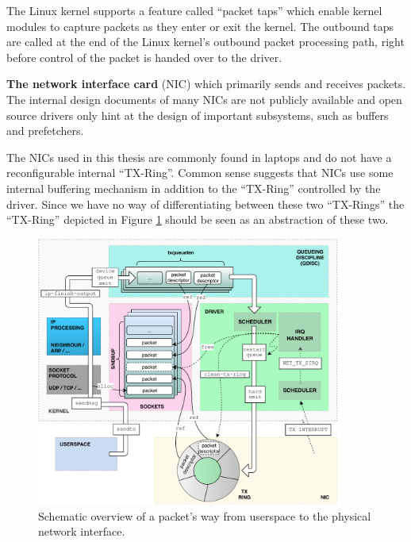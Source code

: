 The Linux kernel supports a feature called ``packet taps'' which enable
kernel modules to capture packets as they enter or exit the kernel. The
outbound taps are called  at the end of the Linux kernel's outbound packet
processing path, right before control of  the packet is handed over to the
driver.

\textbf{The network interface card} (NIC) which primarily sends and
receives packets.  The internal design documents of many NICs are not publicly
available and open source drivers only hint at the design of important
subsystems, such as buffers and prefetchers.

The NICs used in this thesis are commonly found in laptops and do not
have a reconfigurable internal ``TX-Ring''. Common sense suggests that
NICs use some internal buffering mechanism in addition to the ``TX-Ring''
controlled by the driver. Since we have no way of differentiating between
these two ``TX-Rings'' the ``TX-Ring'' depicted in Figure
\ref{fig:linux_egress} should be seen as an abstraction of these two.


\begin{figure}
\center
\includegraphics[width=0.9\textwidth]{images/linux-egress-overview.pdf}
\caption{Schematic overview of a packet's way from userspace to the physical network interface.}
\label{fig:linux_egress}
\end{figure}


